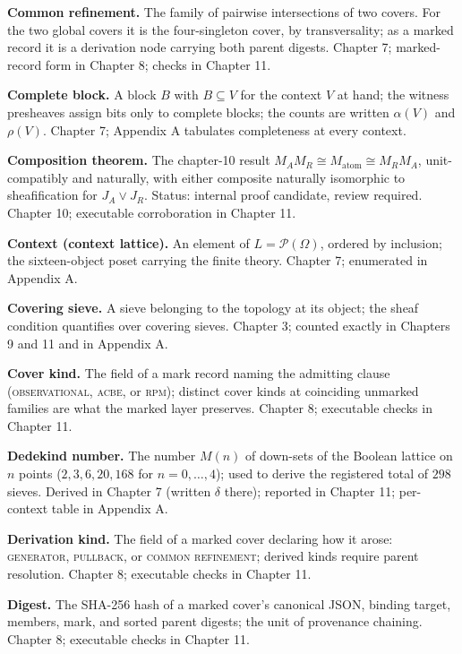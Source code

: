 \textbf{Common refinement.} The family of pairwise intersections of
two covers. For the two global covers it is the four-singleton cover,
by transversality; as a marked record it is a derivation node carrying
both parent digests. Chapter 7; marked-record form in Chapter 8;
checks in Chapter 11.

\textbf{Complete block.} A block $B$ with $B \subseteq V$ for the
context $V$ at hand; the witness presheaves assign bits only to
complete blocks; the counts are written $\alpha(V)$ and $\rho(V)$.
Chapter 7; Appendix A tabulates completeness at every context.

\textbf{Composition theorem.} The chapter-10 result
$M_A M_R \cong M_{\mathrm{atom}} \cong M_R M_A$, unit-compatibly and
naturally, with either composite naturally isomorphic to
sheafification for $J_A \vee J_R$. Status: internal proof candidate,
review required. Chapter 10; executable corroboration in Chapter 11.

\textbf{Context (context lattice).} An element of
$L = \mathcal{P}(\Omega)$, ordered by inclusion; the sixteen-object
poset carrying the finite theory. Chapter 7; enumerated in Appendix
A.

\textbf{Covering sieve.} A sieve belonging to the topology at its
object; the sheaf condition quantifies over covering sieves. Chapter
3; counted exactly in Chapters 9 and 11 and in Appendix A.

\textbf{Cover kind.} The field of a mark record naming the admitting
clause (\textsc{observational}, \textsc{acbe}, or \textsc{rpm});
distinct cover kinds at coinciding unmarked families are what the
marked layer preserves. Chapter 8; executable checks in Chapter 11.

\textbf{Dedekind number.} The number $M(n)$ of down-sets of the
Boolean lattice on $n$ points ($2, 3, 6, 20, 168$ for
$n = 0, \ldots, 4$); used to derive the registered total of $298$
sieves. Derived in Chapter 7 (written $\delta$ there); reported in
Chapter 11; per-context table in Appendix A.

\textbf{Derivation kind.} The field of a marked cover declaring how it
arose: \textsc{generator}, \textsc{pullback}, or
\textsc{common refinement}; derived kinds require parent resolution.
Chapter 8; executable checks in Chapter 11.

\textbf{Digest.} The SHA-256 hash of a marked cover's canonical JSON,
binding target, members, mark, and sorted parent digests; the unit of
provenance chaining. Chapter 8; executable checks in Chapter 11.


